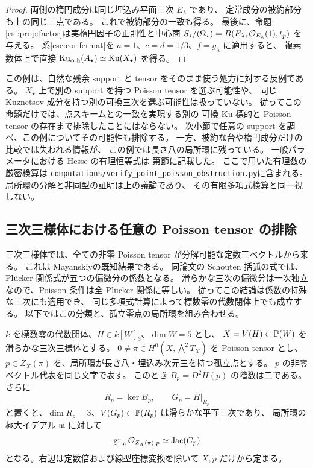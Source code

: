 \begin{proof}
両側の楕円成分は同じ埋込み平面三次 $E_\lambda$ であり、
定常成分の被約部分も上の同じ三点である。
これで被約部分の一致も得る。
最後に、命題\ref{esi:prop:factor}は実楕円因子の正則性と中心商
$S_\star/(\Omega_\star)=B(E_\lambda,\mathcal O_{E_\lambda}(1),t_p)$ を与える。
系\ref{csc:cor:fermat}を $a=1$、$c=d=1/3$、$f=g_\lambda$ に適用すると、
複素数体上で直接 $\operatorname{Ku}_{\mathrm{coh}}(A_\star)\simeq\operatorname{Ku}(X_\star)$ を得る。
\end{proof}

\begin{remark}[自然な処方への反例と存在問題の区別]
この例は、自然な残余 support と tensor をそのまま使う処方に対する反例である。
$X_\star$ 上で別の support を持つ Poisson tensor を選ぶ可能性や、
同じ Kuznetsov 成分を持つ別の可換三次を選ぶ可能性は扱っていない。
従ってこの命題だけでは、点スキームとの一致を実現する別の
可換 Ku 標的と Poisson tensor の存在まで排除したことにはならない。
次小節で任意の support を調べ、この例についてその可能性も排除する。
一方、被約な台や楕円成分だけの比較では失われる情報が、
この例では長さ八の局所環に残っている。
一般パラメータにおける Hesse の有理恒等式は
第節に記載した。
ここで用いた有理数の厳密検算は
\texttt{computations/verify\_point\_poisson\_obstruction.py}に含まれる。
局所環の分解と非同型の証明は上の議論であり、
その有限多項式検算と同一視しない。
\end{remark}

\subsection{三次三様体における任意の Poisson tensor の排除}

三次三様体では、全ての非零 Poisson tensor が分解可能な定数三ベクトルから来る。
これは Mayanskiy\cite[Theorem~1, \S2.2]{Mayanskiy}の既知結果である。
同論文の Schouten 括弧の式では、Pl\"ucker 関係式が五つの偏微分の係数となる。
滑らかな三次の偏微分は一次独立なので、Poisson 条件は全 Pl\"ucker 関係に等しい。
従ってこの結論は係数の特殊な三次にも適用でき、
同じ多項式計算によって標数零の代数閉体上でも成立する。
以下ではこの分類と、孤立零点の局所環を組み合わせる。

\begin{lemma}
\label{ppz:lem:isolated-artin-eckardt}
$k$ を標数零の代数閉体、$H\in k[W]_3$、$\dim W=5$ とし、
$X=V(H)\subset\mathbb P(W)$ を滑らかな三次三様体とする。
$0\ne\pi\in H^0(X,\bigwedge^2T_X)$ を Poisson tensor とし、
$p\in Z_X(\pi)$ を、局所環が長さ八・埋込み次元三を持つ孤立点とする。
$p$ の非零ベクトル代表を同じ文字で表す。
このとき $B_p=D^2H(p)$ の階数は二である。
さらに
\[
 R_p=\ker B_p,\qquad G_p=H|_{R_p}
\]
と置くと、$\dim R_p=3$、$V(G_p)\subset\mathbb P(R_p)$ は滑らかな平面三次であり、
局所環の極大イデアル $\mathfrak m$ に対して
\begin{equation}\label{ppz:eq:eckardt-graded-local}
 \operatorname{gr}_{\mathfrak m}\mathcal O_{Z_X(\pi),p}
 \simeq\operatorname{Jac}(G_p)
\end{equation}
となる。右辺は定数倍および線型座標変換を除いて $X,p$ だけから定まる。
\end{lemma}

